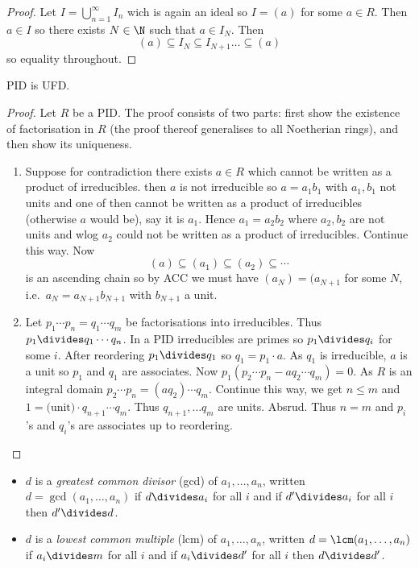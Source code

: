 \documentclass[a4paper]{article}
\theoremstyle{definition}
\begin{document}
\begin{proof}
  Let \(I = \bigcup_{n = 1}^\infty I_n\) wich is again an ideal so \(I = (a)\) for some \(a \in R\). Then \(a \in I\) so there exists \(N \in \N\) such that \(a \in I_N\). Then
  \[
    (a) \subseteq I_N \subseteq I_{N + 1} \dots \subseteq (a)
  \]
  so equality throughout.
\end{proof}

\begin{theorem}
  PID is UFD.
\end{theorem}

\begin{proof}
  Let \(R\) be a PID. The proof consists of two parts: first show the existence of factorisation in \(R\) (the proof thereof generalises to all Noetherian rings), and then show its uniqueness.
  \begin{enumerate}
  \item Suppose for contradiction there exists \(a \in R\) which cannot be written as a product of irreducibles. then \(a\) is not irreducible so \(a = a_1b_1\) with \(a_1, b_1\) not units and one of then cannot be written as a product of irreducibles (otherwise \(a\) would be), say it is \(a_1\). Hence \(a_1 = a_2b_2\) where \(a_2, b_2\) are not units and wlog \(a_2\) could not be written as a product of irreducibles. Continue this way. Now
    \[
      (a) \subseteq (a_1) \subseteq (a_2) \subseteq \cdots
    \]
    is an ascending chain so by ACC we must have \((a_N) = (a_{N + 1}\) for some \(N\), i.e.\ \(a_N = a_{N + 1}b_{N + 1}\) with \(b_{N + 1}\) a unit.
  \item Let \(p_1 \cdots p_n = q_1 \cdots q_m\) be factorisations into irreducibles. Thus \(p_1 \divides q_1 \cdots q_n\). In a PID irreducibles are primes so \(p_1 \divides q_i\) for some \(i\). After reordering \(p_1 \divides q_1\) so \(q_1 = p_1 \cdot a\). As \(q_1\) is irreducible, \(a\) is a unit so \(p_1\) and \(q_1\) are associates. Now \(p_1(p_2 \cdots p_n - aq_2 \cdots q_m) = 0\). As \(R\) is an integral domain \(p_2 \cdots p_n = (aq_2) \cdots q_m\). Continue this way, we get \(n \leq m\) and \(1 = \text{(unit)} \cdot q_{n + 1} \cdots q_m\). Thus \(q_{n + 1}, \dots q_m\) are units. Absrud. Thus \(n = m\) and \(p_i\)'s and \(q_i\)'s are associates up to reordering.
  \end{enumerate}
\end{proof}

\begin{definition}\leavevmode
  \begin{itemize}
  \item \(d\) is a \emph{greatest common divisor} (gcd) of \(a_1, \dots, a_n\), written \(d = \gcd(a_1, \dots, a_n)\) if \(d \divides a_i\) for all \(i\) and if \(d' \divides a_i\) for all \(i\) then \(d' \divides d\).
  \item \(d\) is a \emph{lowest common multiple} (lcm) of \(a_1, \dots, a_n\), written \(d = \lcm(a_1, \dots, a_n)\) if \(a_i \divides m\) for all \(i\) and if \(a_i \divides d'\) for all \(i\) then \(d \divides d'\).
    \end{itemize}
\end{definition}
\end{document}
